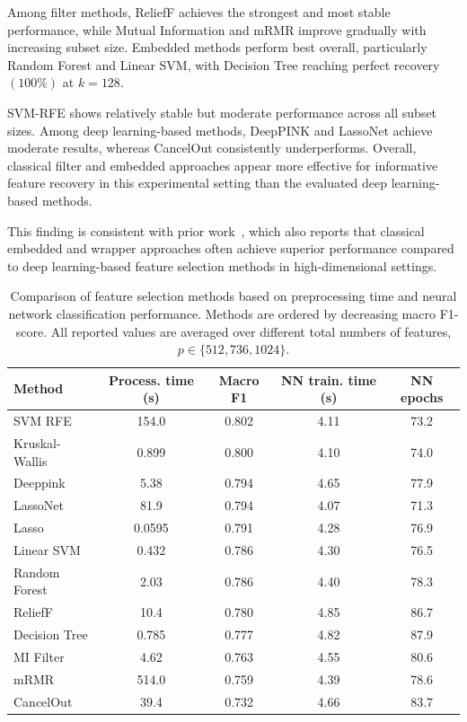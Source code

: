 Among filter methods, ReliefF achieves the strongest and most stable performance, while Mutual Information and mRMR improve gradually with increasing subset size. Embedded methods perform best overall, particularly Random Forest and Linear SVM, with Decision Tree reaching perfect recovery $(100\%)$ at $k=128$.

SVM-RFE shows relatively stable but moderate performance across all subset sizes. Among deep learning-based methods, DeepPINK and LassoNet achieve moderate results, whereas CancelOut consistently underperforms. Overall, classical filter and embedded approaches appear more effective for informative feature recovery in this experimental setting than the evaluated deep learning-based methods.

This finding is consistent with prior work~\cite{passemiers2021}, which also reports that classical embedded and wrapper approaches often achieve superior performance compared to deep learning-based feature selection methods in high-dimensional settings.

\begin{table}[h]
\centering
\begin{tabular}{lcccc}
\hline
Method & Process. time (s) & Macro F1 & NN train. time (s) & NN epochs \\
\hline
SVM RFE                  & 154.0  & 0.802 & 4.11 & 73.2 \\
Kruskal-Wallis    & 0.899  & 0.800 & 4.10 & 74.0 \\
Deeppink                 & 5.38   & 0.794 & 4.65 & 77.9 \\
LassoNet                 & 81.9   & 0.794 & 4.07 & 71.3 \\
Lasso                    & 0.0595 & 0.791 & 4.28 & 76.9 \\
Linear SVM               & 0.432  & 0.786 & 4.30 & 76.5 \\
Random Forest            & 2.03   & 0.786 & 4.40 & 78.3 \\
ReliefF                  & 10.4   & 0.780 & 4.85 & 86.7 \\
Decision Tree            & 0.785  & 0.777 & 4.82 & 87.9 \\
MI Filter& 4.62   & 0.763 & 4.55 & 80.6 \\
mRMR                     & 514.0  & 0.759 & 4.39 & 78.6 \\
CancelOut                & 39.4   & 0.732 & 4.66 & 83.7 \\
\hline
\end{tabular}
\caption{Comparison of feature selection methods based on preprocessing time and neural network classification performance. Methods are ordered by decreasing macro F1-score. All reported values are averaged over different total numbers of features, $p \in \{512, 736, 1024\}$.}
\label{tab:fs_nn_comparison}
\end{table}

